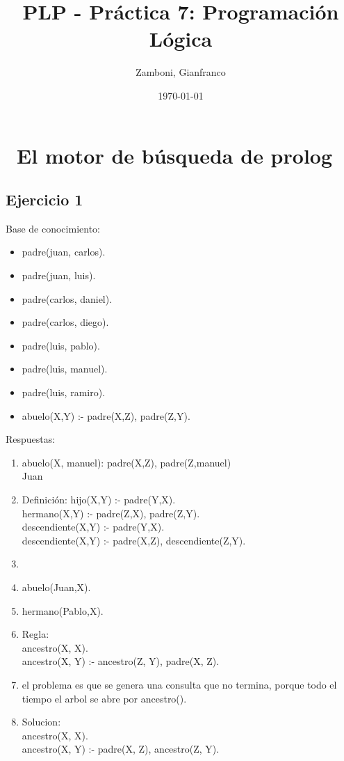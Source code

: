 \documentclass[10pt,a4paper]{article}
\begin{document}
  \title{PLP - Práctica 7: Programación Lógica}

  \date{\today}

  \author{Zamboni, Gianfranco}

  \maketitle
  \setcounter{page}{1}


\section*{\ El motor de búsqueda de prolog}
\subsection{Ejercicio 1}
Base de conocimiento:
\begin{itemize}
    \item padre(juan, carlos).
    \item padre(juan, luis).
    \item padre(carlos, daniel).
    \item padre(carlos, diego).
    \item padre(luis, pablo).
    \item padre(luis, manuel).
    \item padre(luis, ramiro).
    \item abuelo(X,Y) :- padre(X,Z), padre(Z,Y).
\end{itemize}
Respuestas:
\begin{enumerate}
\item abuelo(X, manuel): padre(X,Z), padre(Z,manuel) \\
Juan
\item Definición:
hijo(X,Y) :- padre(Y,X). \\
hermano(X,Y) :- padre(Z,X), padre(Z,Y). \\
descendiente(X,Y) :- padre(Y,X). \\
descendiente(X,Y) :- padre(X,Z), descendiente(Z,Y).
\item {}
\item abuelo(Juan,X).
\item hermano(Pablo,X).
\item Regla: \\
ancestro(X, X). \\
ancestro(X, Y) :- ancestro(Z, Y), padre(X, Z).
\item el problema es que se genera una consulta que no termina, porque todo el tiempo el arbol se abre por ancestro().
\item Solucion: \\
ancestro(X, X). \\
ancestro(X, Y) :- padre(X, Z), ancestro(Z, Y).
\end{enumerate}
\end{document}
